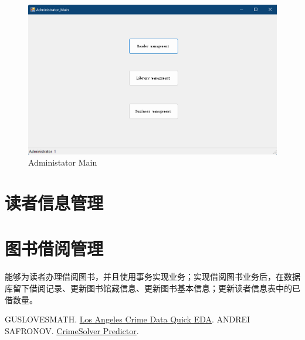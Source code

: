 \documentclass{article}
\begin{document}
\begin{figure}[H]
    \centering
    \includegraphics[width=1\textwidth]{../pic/admin_main.png}
    \caption{Administator Main}
    \label{fig:admin_main}
\end{figure}


\section{读者信息管理}

\section{图书借阅管理}
能够为读者办理借阅图书，并且使用事务实现业务；实现借阅图书业务后，在数据库留下借阅记录、更新图书馆藏信息、更新图书基本信息；更新读者信息表中的已借数量。

\begin{thebibliography}{99}
     GUSLOVESMATH. \href{https://www.kaggle.com/code/guslovesmath/los-angeles-crime-data-quick-eda}{Los Angeles Crime Data Quick EDA}.
     ANDREI SAFRONOV. \href{https://www.kaggle.com/code/safronov00/crimesolver-predictor#2.-Clean-Data}{CrimeSolver Predictor}.
\end{thebibliography}
\end{document}
